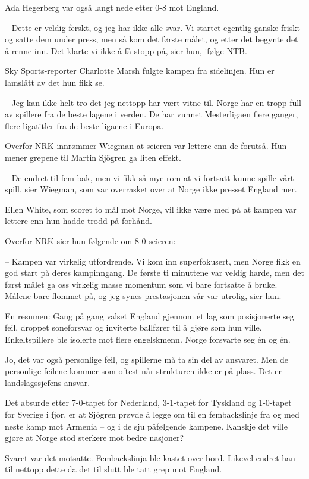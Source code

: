 Ada Hegerberg var også langt nede etter 0-8 mot England.

– Dette er veldig ferskt, og jeg har ikke alle svar. Vi startet egentlig ganske friskt og satte dem under press, men så kom det første målet, og etter det begynte det å renne inn. Det klarte vi ikke å få stopp på, sier hun, ifølge NTB.

Sky Sports-reporter Charlotte Marsh fulgte kampen fra sidelinjen. Hun er lamslått av det hun fikk se.

– Jeg kan ikke helt tro det jeg nettopp har vært vitne til. Norge har en tropp full av spillere fra de beste lagene i verden. De har vunnet Mesterligaen flere ganger, flere ligatitler fra de beste ligaene i Europa.

Overfor NRK innrømmer Wiegman at seieren var lettere enn de forutså. Hun mener grepene til Martin Sjögren ga liten effekt.

– De endret til fem bak, men vi fikk så mye rom at vi fortsatt kunne spille vårt spill, sier Wiegman, som var overrasket over at Norge ikke presset England mer.

Ellen White, som scoret to mål mot Norge, vil ikke være med på at kampen var lettere enn hun hadde trodd på forhånd.

Overfor NRK sier hun følgende om 8-0-seieren:

– Kampen var virkelig utfordrende. Vi kom inn superfokusert, men Norge fikk en god start på deres kampinngang. De første ti minuttene var veldig harde, men det først målet ga oss virkelig masse momentum som vi bare fortsatte å bruke. Målene bare flommet på, og jeg synes prestasjonen vår var utrolig, sier hun.

En resumen: 
Gang på gang valset England gjennom et lag som posisjonerte seg feil, droppet soneforsvar og inviterte ballfører til å gjøre som hun ville. Enkeltspillere ble isolerte mot flere engelskmenn. Norge forsvarte seg én og én.

Jo, det var også personlige feil, og spillerne må ta sin del av ansvaret. Men de personlige feilene kommer som oftest når strukturen ikke er på plass. Det er landslagssjefens ansvar.

Det absurde etter 7-0-tapet for Nederland, 3-1-tapet for Tyskland og 1-0-tapet for Sverige i fjor, er at Sjögren prøvde å legge om til en fembackslinje fra og med neste kamp mot Armenia – og i de sju påfølgende kampene. Kanskje det ville gjøre at Norge stod sterkere mot bedre nasjoner?

Svaret var det motsatte. Fembackslinja ble kastet over bord. Likevel endret han til nettopp dette da det til slutt ble tatt grep mot England.

